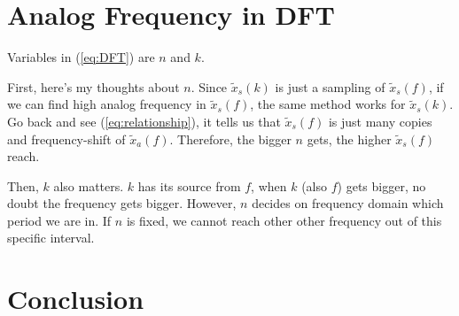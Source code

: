 \documentclass{article}
\begin{document}
\section{Analog Frequency in DFT}
Variables in (\ref{eq:DFT}) are $n$ and $k$.

First, here's my thoughts about $n$. Since $\widetilde{x}_s(k)$ is just a sampling of $\widetilde{x}_s(f)$, if we can find high analog frequency in $\widetilde{x}_s(f)$, the same method works for $\widetilde{x}_s(k)$. Go back and see (\ref{eq:relationship}), it tells us that $\widetilde{x}_s(f)$ is just many copies and frequency-shift of $\widetilde{x}_a(f)$. Therefore, the bigger $n$ gets, the higher $\widetilde{x}_s(f)$ reach. 

Then, $k$ also matters. $k$ has its source from $f$, when $k$ (also $f$) gets bigger, no doubt the frequency gets bigger. However, $n$ decides on frequency domain which period we are in. If $n$ is fixed, we cannot reach other other frequency out of this specific interval.  


\section{Conclusion}






\begin{appendices}

\end{appendices}
\end{document}

